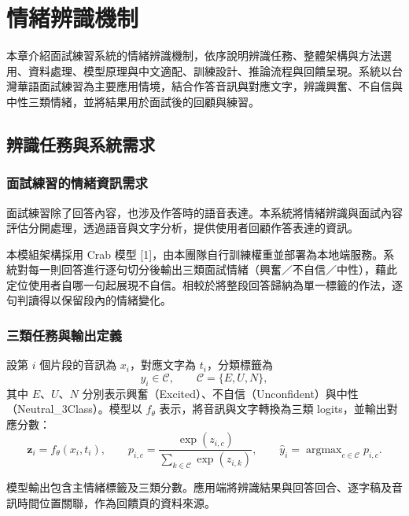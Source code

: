\chapter{情緒辨識機制}
\label{chap:emotion}

本章介紹面試練習系統的情緒辨識機制，依序說明辨識任務、整體架構與方法選用、資料處理、模型原理與中文適配、訓練設計、推論流程與回饋呈現。系統以台灣華語面試練習為主要應用情境，結合作答音訊與對應文字，辨識興奮、不自信與中性三類情緒，並將結果用於面試後的回顧與練習。

\section{辨識任務與系統需求}
\label{sec:task}

\subsection{面試練習的情緒資訊需求}
面試練習除了回答內容，也涉及作答時的語音表達。本系統將情緒辨識與面試內容評估分開處理，透過語音與文字分析，提供使用者回顧作答表達的資訊。

本模組架構採用 Crab 模型 [1]，由本團隊自行訓練權重並部署為本地端服務。系統對每一則回答進行逐句切分後輸出三類面試情緒（興奮／不自信／中性），藉此定位使用者自哪一句起展現不自信。相較於將整段回答歸納為單一標籤的作法，逐句判讀得以保留段內的情緒變化。


\subsection{三類任務與輸出定義}
設第 $i$ 個片段的音訊為 $x_i$，對應文字為 $t_i$，分類標籤為
\begin{equation}
 y_i\in\mathcal{C},\qquad \mathcal{C}=\{E,U,N\},
 \label{eq:classes}
\end{equation}
其中 $E$、$U$、$N$ 分別表示興奮（Excited）、不自信（Unconfident）與中性（Neutral\_3Class）。模型以 $f_\theta$ 表示，將音訊與文字轉換為三類 logits，並輸出對應分數：
\begin{equation}
 \boldsymbol z_i=f_\theta(x_i,t_i),\qquad
 p_{i,c}=\frac{\exp(z_{i,c})}{\sum_{k\in\mathcal C}\exp(z_{i,k})},\qquad
 \hat y_i=\mathop{\arg\max}_{c\in\mathcal C}p_{i,c}.
 \label{eq:prediction}
\end{equation}

模型輸出包含主情緒標籤及三類分數。應用端將辨識結果與回答回合、逐字稿及音訊時間位置關聯，作為回饋頁的資料來源。

